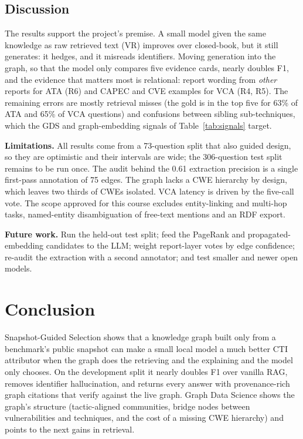 \documentclass[conference]{IEEEtran}
\begin{document}
\subsection{Discussion}

The results support the project's premise. A small model given the same knowledge as raw retrieved text (VR) improves over closed-book, but it still generates: it hedges, and it misreads identifiers. Moving generation into the graph, so that the model only compares five evidence cards, nearly doubles F1, and the evidence that matters most is relational: report wording from \emph{other} reports for ATA (R6) and CAPEC and CVE examples for VCA (R4, R5). The remaining errors are mostly retrieval misses (the gold is in the top five for 63\% of ATA and 65\% of VCA questions) and confusions between sibling sub-techniques, which the GDS and graph-embedding signals of Table~\ref{tab:signals} target.

\textbf{Limitations.} All results come from a 73-question split that also guided design, so they are optimistic and their intervals are wide; the 306-question test split remains to be run once. The audit behind the 0.61 extraction precision is a single first-pass annotation of 75 edges. The graph lacks a CWE hierarchy by design, which leaves two thirds of CWEs isolated. VCA latency is driven by the five-call vote. The scope approved for this course excludes entity-linking and multi-hop tasks, named-entity disambiguation of free-text mentions and an RDF export.

\textbf{Future work.} Run the held-out test split; feed the PageRank and propagated-embedding candidates to the LLM; weight report-layer votes by edge confidence; re-audit the extraction with a second annotator; and test smaller and newer open models.

\section{Conclusion}

Snapshot-Guided Selection shows that a knowledge graph built only from a benchmark's public snapshot can make a small local model a much better CTI attributor when the graph does the retrieving and the explaining and the model only chooses. On the development split it nearly doubles F1 over vanilla RAG, removes identifier hallucination, and returns every answer with provenance-rich graph citations that verify against the live graph. Graph Data Science shows the graph's structure (tactic-aligned communities, bridge nodes between vulnerabilities and techniques, and the cost of a missing CWE hierarchy) and points to the next gains in retrieval.
\end{document}

